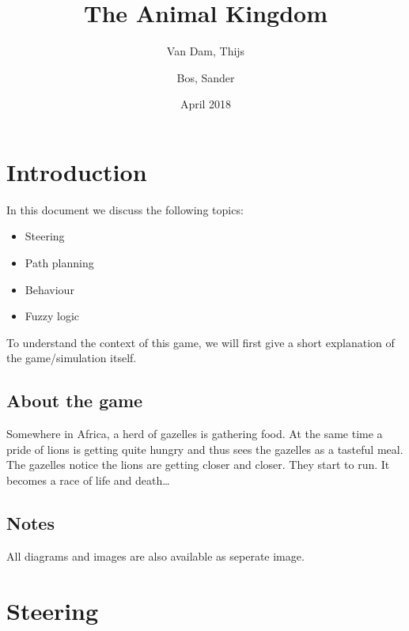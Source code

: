 \documentclass[11pt]{article}
\author{Van Dam, Thijs\\
\and
Bos, Sander\\
}
\title{\huge The Animal Kingdom}
\date{April 2018}
\begin{document}
    \maketitle
    \thispagestyle{empty}
    \newpage
    \newpage
    \setcounter{page}{1}
    \section{Introduction}\label{sec:introduction}
    In this document we discuss the following topics:
    \begin{itemize}
        \item Steering
        \item Path planning
        \item Behaviour
        \item Fuzzy logic
    \end{itemize}
    
    To understand the context of this game, we will first give a short explanation of the game/simulation itself.
    
    \subsection*{About the game}\label{subsec:about}
    Somewhere in Africa, a herd of gazelles is gathering food.
    At the same time a pride of lions is getting quite hungry and thus sees the gazelles as a tasteful meal.
    The gazelles notice the lions are getting closer and closer.
    They start to run.
    It becomes a race of life and death\ldots
    
    \subsection*{Notes}\label{subsec:notes}
    All diagrams and images are also available as seperate image.

    \newpage
    \tableofcontents
    
    \newpage
    \section{Steering}\label{sec:steering}
    

    \newpage
\end{document}
